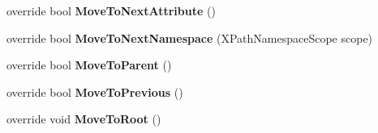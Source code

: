 \begin{DoxyCompactItemize}
override bool {\bfseries Move\+To\+Next\+Attribute} ()
\item 
\mbox{\label{class_html_agility_pack_1_1_html_node_navigator_ac9bda3370936604949129419e5391de9}} 
override bool {\bfseries Move\+To\+Next\+Namespace} (X\+Path\+Namespace\+Scope scope)
\item 
\mbox{\label{class_html_agility_pack_1_1_html_node_navigator_a8311f3f39aa7bd70759d17c8a5f818cb}} 
override bool {\bfseries Move\+To\+Parent} ()
\item 
\mbox{\label{class_html_agility_pack_1_1_html_node_navigator_ac9b5c01a44a3af6b6c83c1a2feae579d}} 
override bool {\bfseries Move\+To\+Previous} ()
\item 
\mbox{\label{class_html_agility_pack_1_1_html_node_navigator_a8936111aa11047198917172e0cf79a36}} 
override void {\bfseries Move\+To\+Root} ()
\end{DoxyCompactItemize}
